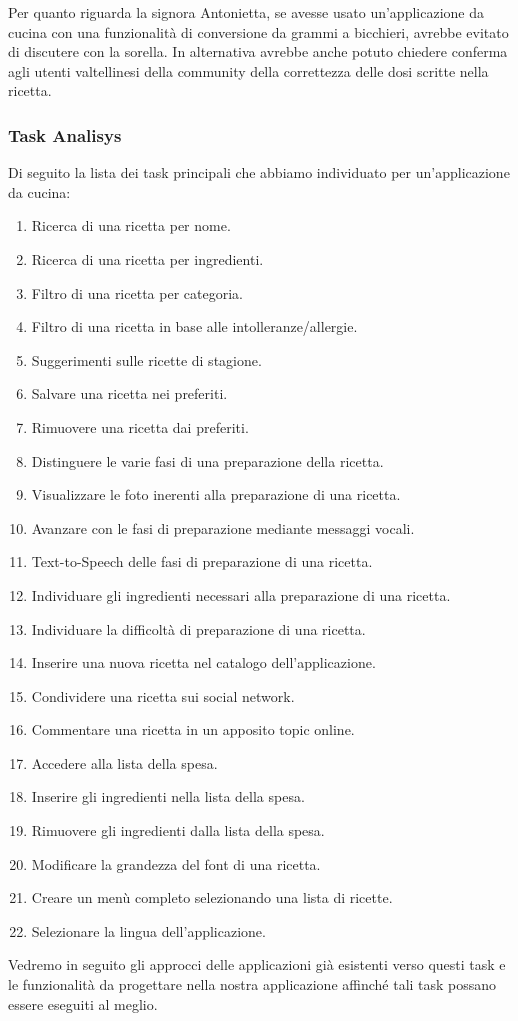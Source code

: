 Per quanto riguarda la signora Antonietta, se avesse usato un'applicazione 
da cucina con una funzionalità di conversione da grammi a
bicchieri, avrebbe evitato di discutere con la sorella. In
alternativa avrebbe anche potuto chiedere conferma agli
utenti valtellinesi della community della correttezza delle dosi scritte
nella ricetta.

\subsubsection{Task Analisys}
Di seguito la lista dei task principali che abbiamo individuato per un'applicazione da
cucina:
\begin{enumerate}
\label{tasks}
\item Ricerca di una ricetta per nome.
\item Ricerca di una ricetta per ingredienti.
\item Filtro di una ricetta per categoria.
\item Filtro di una ricetta in base alle intolleranze/allergie.
\item Suggerimenti sulle ricette di stagione.
\item Salvare una ricetta nei preferiti.
\item Rimuovere una ricetta dai preferiti.
\item Distinguere le varie fasi di una preparazione della ricetta.
\item Visualizzare le foto inerenti alla preparazione di
una ricetta.
\item Avanzare con le fasi di preparazione mediante messaggi vocali.
\item Text-to-Speech delle fasi di preparazione di una ricetta.
\item Individuare gli ingredienti necessari alla preparazione di una
ricetta.
\item Individuare la difficoltà di preparazione di una ricetta.
\item Inserire una nuova ricetta nel catalogo dell'applicazione.
\item Condividere una ricetta sui social network.
\item Commentare una ricetta in un apposito topic online.
\item Accedere alla lista della spesa.
\item Inserire gli ingredienti nella lista della spesa.
\item Rimuovere gli ingredienti dalla lista della spesa.
\item Modificare la grandezza del font di una ricetta.
\item Creare un menù completo selezionando una lista di ricette.
\item Selezionare la lingua dell'applicazione.
\end{enumerate}

Vedremo in seguito gli approcci delle applicazioni già esistenti verso
questi task e le funzionalità da progettare nella nostra applicazione
affinché tali task possano essere eseguiti al meglio.
